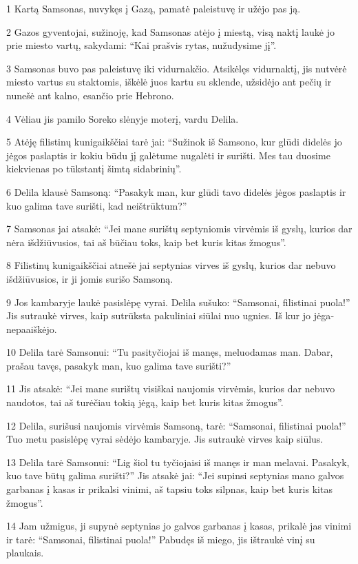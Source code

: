 \par 1 Kartą Samsonas, nuvykęs į Gazą, pamatė paleistuvę ir užėjo pas ją. 
\par 2 Gazos gyventojai, sužinoję, kad Samsonas atėjo į miestą, visą naktį laukė jo prie miesto vartų, sakydami: “Kai prašvis rytas, nužudysime jį”. 
\par 3 Samsonas buvo pas paleistuvę iki vidurnakčio. Atsikėlęs vidurnaktį, jis nutvėrė miesto vartus su staktomis, iškėlė juos kartu su sklende, užsidėjo ant pečių ir nunešė ant kalno, esančio prie Hebrono. 
\par 4 Vėliau jis pamilo Soreko slėnyje moterį, vardu Delila. 
\par 5 Atėję filistinų kunigaikščiai tarė jai: “Sužinok iš Samsono, kur glūdi didelės jo jėgos paslaptis ir kokiu būdu jį galėtume nugalėti ir surišti. Mes tau duosime kiekvienas po tūkstantį šimtą sidabrinių”. 
\par 6 Delila klausė Samsoną: “Pasakyk man, kur glūdi tavo didelės jėgos paslaptis ir kuo galima tave surišti, kad neištrūktum?” 
\par 7 Samsonas jai atsakė: “Jei mane surištų septyniomis virvėmis iš gyslų, kurios dar nėra išdžiūvusios, tai aš būčiau toks, kaip bet kuris kitas žmogus”. 
\par 8 Filistinų kunigaikščiai atnešė jai septynias virves iš gyslų, kurios dar nebuvo išdžiūvusios, ir ji jomis surišo Samsoną. 
\par 9 Jos kambaryje laukė pasislėpę vyrai. Delila sušuko: “Samsonai, filistinai puola!” Jis sutraukė virves, kaip sutrūksta pakuliniai siūlai nuo ugnies. Iš kur jo jėga­nepaaiškėjo. 
\par 10 Delila tarė Samsonui: “Tu pasityčiojai iš manęs, meluodamas man. Dabar, prašau tavęs, pasakyk man, kuo galima tave surišti?” 
\par 11 Jis atsakė: “Jei mane surištų visiškai naujomis virvėmis, kurios dar nebuvo naudotos, tai aš turėčiau tokią jėgą, kaip bet kuris kitas žmogus”. 
\par 12 Delila, surišusi naujomis virvėmis Samsoną, tarė: “Samsonai, filistinai puola!” Tuo metu pasislėpę vyrai sėdėjo kambaryje. Jis sutraukė virves kaip siūlus. 
\par 13 Delila tarė Samsonui: “Lig šiol tu tyčiojaisi iš manęs ir man melavai. Pasakyk, kuo tave būtų galima surišti?” Jis atsakė jai: “Jei supinsi septynias mano galvos garbanas į kasas ir prikalsi vinimi, aš tapsiu toks silpnas, kaip bet kuris kitas žmogus”. 
\par 14 Jam užmigus, ji supynė septynias jo galvos garbanas į kasas, prikalė jas vinimi ir tarė: “Samsonai, filistinai puola!” Pabudęs iš miego, jis ištraukė vinį su plaukais. 
